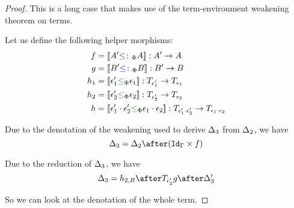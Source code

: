 \documentclass{Report}
\begin{document}
\begin{framed}
\begin{proof}
        \case{\vbind}
    
        This is a long case that makes use of the term-environment weakening theorem on terms.
    
        Let us define the following helper morphisms:
        \begin{align*}
            f & = \deno{A' \subtypep A}: A' \rightarrow A\\
            g & = \deno{B' \subtypep B}: B' \rightarrow B\\
            h_1 & = \deno{\e_1' \subeffectp \e_1} : \T{\e_1'}{} \rightarrow \T{\e_1}{} \\
            h_2 & = \deno{\e_2'\subeffectp \e_2}:\T{\e_2'}{} \rightarrow \T{\e_2}{}\\
            h & = \deno{\e_1'\dot\e_2'\subeffectp\e_1\dot\e_2}: \T{\e_1'\dot\e_2'}{}\rightarrow \T{\e_1\dot\e_2}{}
        \end{align*}
    
        Due to the denotation of the weakening used to derive $\Delta_3$ from $\Delta_2$, we have 
        \begin{equation}
            \D_3 = \D_2\after(\idg\times f)
        \end{equation}
    
        Due to the reduction of $\Delta_3$,
        we have 
        \begin{equation}
            \D_3 = h_{2, B} \after \T{\e_2'}{g}\after \D_3'
        \end{equation}
    
        So we can look at the denotation of the whole term.
    

\end{proof}
\end{framed}
\end{document}

